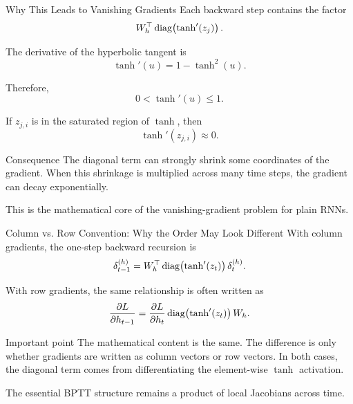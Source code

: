 \documentclass[aspectratio=169]{beamer}
\begin{document}
%
%
\begin{frame}{Why This Leads to Vanishing Gradients}
\small
Each backward step contains the factor
\[
W_h^{\top}\operatorname{diag}\!\left(\tanh'(z_j)\right).
\]

The derivative of the hyperbolic tangent is
\[
\tanh'(u) = 1 - \tanh^2(u).
\]

Therefore,
\[
0 < \tanh'(u) \leq 1.
\]

\vspace{0.15cm}
If $z_{j,i}$ is in the saturated region of $\tanh$, then
\[
\tanh'(z_{j,i}) \approx 0.
\]

\begin{alertblock}{Consequence}
The diagonal term can strongly shrink some coordinates of the gradient. When this shrinkage is multiplied across many time steps, the gradient can decay exponentially.
\end{alertblock}

This is the mathematical core of the vanishing-gradient problem for plain RNNs.
\end{frame}
%
%
\begin{frame}{Column vs. Row Convention: Why the Order May Look Different}
\small
With column gradients, the one-step backward recursion is
\[
\delta_{t-1}^{(h)}
= W_h^{\top}\operatorname{diag}\!\left(\tanh'(z_t)\right)\delta_t^{(h)}.
\]

With row gradients, the same relationship is often written as
\[
\frac{\partial L}{\partial h_{t-1}}
= \frac{\partial L}{\partial h_t}
\operatorname{diag}\!\left(\tanh'(z_t)\right) W_h.
\]

\vspace{0.2cm}
\begin{block}{Important point}
The mathematical content is the same. The difference is only whether gradients are written as column vectors or row vectors. In both cases, the diagonal term comes from differentiating the element-wise $\tanh$ activation.
\end{block}

\vspace{0.1cm}
The essential BPTT structure remains a product of local Jacobians across time.
\end{frame}
%
%
\end{document}
